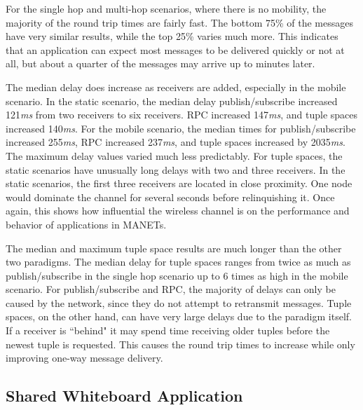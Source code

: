 \documentclass[lnicst]{svmultln}
\begin{document}
For the single hop and multi-hop scenarios, where there is no mobility, the majority of the round trip times are fairly fast. The bottom 75\% of the messages have very similar results, while the top 25\% varies much more. This indicates that an application can expect most messages to be delivered quickly or not at all, but about a quarter of the messages may arrive up to minutes later.

The median delay does increase as receivers are added, especially in the mobile scenario. In the static scenario, the median delay publish/subscribe increased 121\textit{ms} from two receivers to six receivers. RPC increased 147\textit{ms}, and tuple spaces increased 140\textit{ms}. For the mobile scenario, the median times for publish/subscribe increased 255\textit{ms}, RPC increased 237\textit{ms}, and tuple spaces increased by 2035\textit{ms}. The maximum delay values varied much less predictably. For tuple spaces, the static scenarios have unusually long delays with two and three receivers. In the static scenarios, the first three receivers are located in close proximity. One node would dominate the channel for several seconds before relinquishing it. Once again, this shows how influential the wireless channel is on the performance and behavior of applications in MANETs.

The median and maximum tuple space results are much longer than the other two paradigms. The median delay for tuple spaces ranges from twice as much as publish/subscribe in the single hop scenario up to 6 times as high in the mobile scenario. For publish/subscribe and RPC, the majority of delays can only be caused by the network, since they do not attempt to retransmit messages. Tuple spaces, on the other hand, can have very large delays due to the paradigm itself.
If a receiver is ``behind" it may spend time receiving older tuples before the newest tuple is requested. This causes the round trip times to increase while only improving one-way message delivery.

\subsection{Shared Whiteboard Application}
\end{document}
